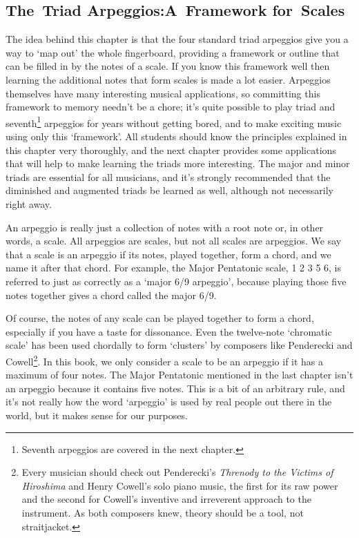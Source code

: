 \documentclass[english]{./gbook}
\newcommand{\titlebreak}{}
\begin{document}
\begin{large}
\chapter{\mbox{The Triad} \mbox{Arpeggios}:\titlebreak \mbox{A Framework} \mbox{for Scales}}

The idea behind this chapter is that the four standard triad arpeggios give you a way to `map out' the whole fingerboard, providing a framework or outline that can be filled in by the notes of a scale. If you know this framework well then learning the additional notes that form scales is made a lot easier. Arpeggios themselves have many interesting musical applications, so committing this framework to memory needn't be a chore; it's quite possible to play triad and seventh\footnote{Seventh arpeggios are covered in the next chapter.} arpeggios for years without getting bored, and to make exciting music using only this `framework'. All students should know the principles explained in this chapter very thoroughly, and the next chapter provides some applications that will help to make learning the triads more interesting. The major and minor triads are essential for all musicians, and it's strongly recommended that the diminished and augmented triads be learned as well, although not necessarily right away.

An arpeggio is really just a collection of notes with a root note or, in other words, a scale. All arpeggios are scales, but not all scales are arpeggios. We say that a scale is an arpeggio if its notes, played together, form a chord, and we name it after that chord. For example, the Major Pentatonic scale, 1 2 3 5 6, is referred to just as correctly as a `major 6/9 arpeggio', because playing those five notes together gives a chord called the major 6/9. 

Of course, the notes of any scale can be played together to form a chord, especially if you have a taste for dissonance. Even the twelve-note `chromatic scale' has been used chordally to form `clusters' by composers like Penderecki and Cowell\footnote{Every musician should check out Penderecki's \emph{Threnody to the Victims of Hiroshima} and Henry Cowell's solo piano music, the first for its raw power and the second for Cowell's inventive and irreverent approach to the instrument. As both composers knew, theory should be a tool, not straitjacket.}. In this book, we only consider a scale to be an arpeggio if it has a maximum of four notes. The Major Pentatonic mentioned in the last chapter isn't an arpeggio because it contains five notes. This is a bit of an arbitrary rule, and it's not really how the word `arpeggio' is used by real people out there in the world, but it makes sense for our purposes.


\end{large}
\end{document}
